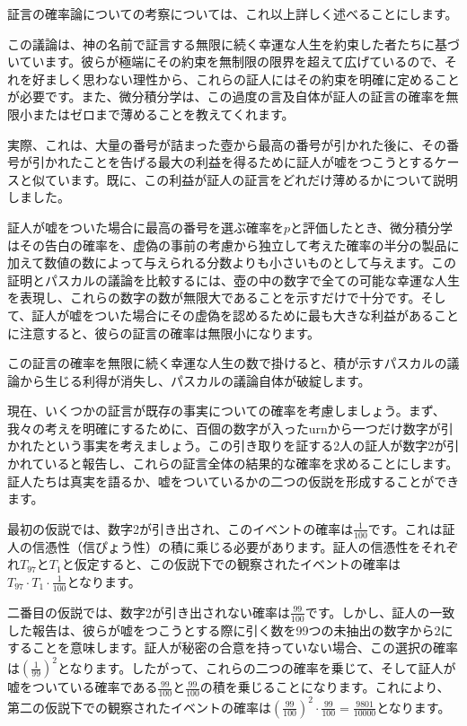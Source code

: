 \documentclass[a4paper,11pt,openany]{ltjsbook}
\begin{document}
証言の確率論についての考察については、これ以上詳しく述べることにします。

この議論は、神の名前で証言する無限に続く幸運な人生を約束した者たちに基づいています。彼らが極端にその約束を無制限の限界を超えて広げているので、それを好ましく思わない理性から、これらの証人にはその約束を明確に定めることが必要です。また、微分積分学は、この過度の言及自体が証人の証言の確率を無限小またはゼロまで薄めることを教えてくれます。

実際、これは、大量の番号が詰まった壺から最高の番号が引かれた後に、その番号が引かれたことを告げる最大の利益を得るために証人が嘘をつこうとするケースと似ています。既に、この利益が証人の証言をどれだけ薄めるかについて説明しました。

証人が嘘をついた場合に最高の番号を選ぶ確率を$p$と評価したとき、微分積分学はその告白の確率を、虚偽の事前の考慮から独立して考えた確率の半分の製品に加えて数値の数によって与えられる分数よりも小さいものとして与えます。この証明とパスカルの議論を比較するには、壺の中の数字で全ての可能な幸運な人生を表現し、これらの数字の数が無限大であることを示すだけで十分です。そして、証人が嘘をついた場合にその虚偽を認めるために最も大きな利益があることに注意すると、彼らの証言の確率は無限小になります。

この証言の確率を無限に続く幸運な人生の数で掛けると、積が示すパスカルの議論から生じる利得が消失し、パスカルの議論自体が破綻します。

現在、いくつかの証言が既存の事実についての確率を考慮しましょう。まず、我々の考えを明確にするために、百個の数字が入ったurnから一つだけ数字が引かれたという事実を考えましょう。この引き取りを証する2人の証人が数字2が引かれていると報告し、これらの証言全体の結果的な確率を求めることにします。証人たちは真実を語るか、嘘をついているかの二つの仮説を形成することができます。

最初の仮説では、数字2が引き出され、このイベントの確率は$\frac{1}{100}$です。これは証人の信憑性（信ぴょう性）の積に乘じる必要があります。証人の信憑性をそれぞれ$T_{97}$と$T_1$と仮定すると、この仮説下での観察されたイベントの確率は$T_{97} \cdot T_1 \cdot \frac{1}{100}$となります。

二番目の仮説では、数字2が引き出されない確率は$\frac{99}{100}$です。しかし、証人の一致した報告は、彼らが嘘をつこうとする際に引く数を99つの未抽出の数字から2にすることを意味します。証人が秘密の合意を持っていない場合、この選択の確率は$\left(\frac{1}{99}\right)^2$となります。したがって、これらの二つの確率を乗じて、そして証人が嘘をついている確率である$\frac{99}{100}$と$\frac{99}{100}$の積を乗じることになります。これにより、第二の仮説下での観察されたイベントの確率は$\left(\frac{99}{100}\right)^2 \cdot \frac{99}{100} = \frac{9801}{10000}$となります。
\end{document}
